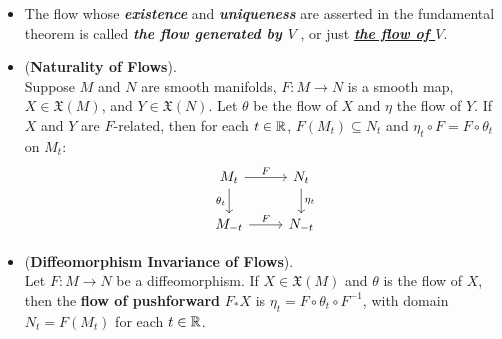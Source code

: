 \documentclass[11pt]{article}
\begin{document}
\begin{itemize}
\item \begin{remark}
The flow whose \emph{\textbf{existence}} and \emph{\textbf{uniqueness}} are asserted in the fundamental theorem is called \emph{\textbf{the flow generated by $V$}} , or just \underline{\emph{\textbf{the flow of $V$}}}. 
\end{remark}


\item \begin{proposition} (\textbf{Naturality of Flows}). \citep{lee2003introduction} \\
Suppose $M$ and $N$ are smooth manifolds, $F: M \rightarrow N$ is a smooth map,  $X \in \mathfrak{X}(M)$, and $Y \in \mathfrak{X}(N)$.  Let $\theta$ be the flow of $X$
and $\eta$ the flow of $Y$. If $X$ and $Y$ are $F$-related, then for each $t \in {\mathbb R}$, $F(M_t) \subseteq N_t$ and $\eta_t \circ F = F \circ \theta_t$ on $M_t$:
\[
  \begin{tikzcd}
    M_t \arrow{r}{F} \arrow[swap]{d}{\theta_t} & N_t \arrow{d}{\eta_t} \\
    M_{-t} \arrow{r}{F} & N_{-t}
  \end{tikzcd}
\]
\end{proposition}

\item \begin{corollary} (\textbf{Diffeomorphism Invariance of Flows}).\\
 Let $F: M \rightarrow N$ be a diffeomorphism. If $X \in \mathfrak{X}(M)$ and $\theta$ is the flow of $X$, then the \textbf{flow of pushforward} $F_{*}X$ is $\eta_t =   F \circ \theta_t \circ F^{-1}$, with domain $N_t = F(M_t)$ for each $t \in {\mathbb R}$. 
\end{corollary}
\end{itemize}
\end{document}
